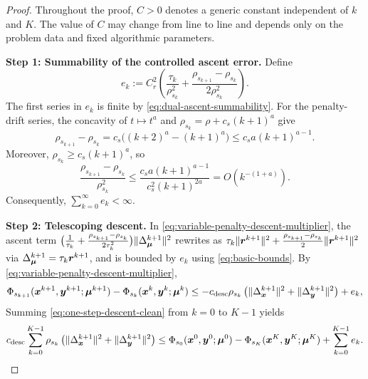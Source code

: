 \begin{proof}
Throughout the proof, $C>0$ denotes a generic constant independent of $k$
and $K$.  The value of $C$ may change from line to line and depends only on
the problem data and fixed algorithmic parameters.

\textbf{Step 1: Summability of the controlled ascent error.}
Define
\[
    e_k
    :=
    C_r^2\left(
    \frac{\tau_k}{\rho_{s_k}^2}
    +
    \frac{\rho_{s_{k+1}}-\rho_{s_k}}{2\rho_{s_k}^2}
    \right).
\]
The first series in $e_k$ is finite by
\eqref{eq:dual-ascent-summability}.  For the penalty-drift series, the
concavity of $t\mapsto t^a$ and
$\rho_{s_k}=\rho+c_s(k+1)^a$ give
\[
    \rho_{s_{k+1}}-\rho_{s_k}
    =
    c_s\bigl((k+2)^a-(k+1)^a\bigr)
    \le
    c_sa(k+1)^{a-1}.
\]
Moreover, $\rho_{s_k}\ge c_s(k+1)^a$, so
\[
    \frac{\rho_{s_{k+1}}-\rho_{s_k}}{\rho_{s_k}^2}
    \le
    \frac{c_sa(k+1)^{a-1}}{c_s^2(k+1)^{2a}}
    =
    O(k^{-(1+a)}).
\]
Consequently, $\sum_{k=0}^{\infty}e_k<\infty$.

\textbf{Step 2: Telescoping descent.}
In \eqref{eq:variable-penalty-descent-multiplier}, the ascent term
$\bigl(\frac{1}{\tau_k}+\frac{\rho_{s_{k+1}}-\rho_{s_k}}{2\tau_k^2}\bigr)
\|\Delta_{\bm{\mu}}^{k+1}\|^2$ rewrites as
$\tau_k\|\bm{r}^{k+1}\|^2+\frac{\rho_{s_{k+1}}-\rho_{s_k}}{2}\|\bm{r}^{k+1}\|^2$
via $\Delta_{\bm{\mu}}^{k+1}=\tau_k\bm{r}^{k+1}$, and is bounded by $e_k$ using
\eqref{eq:basic-bounds}.
By \eqref{eq:variable-penalty-descent-multiplier}, 
\begin{equation}\label{eq:one-step-descent-clean}
    \Phi_{s_{k+1}}(\bm{x}^{k+1},\bm{y}^{k+1};\bm{\mu}^{k+1})
    -
    \Phi_{s_k}(\bm{x}^k,\bm{y}^k;\bm{\mu}^k)
    \le
    -c_{\mathrm{desc}}\rho_{s_k}
    \left(\|\Delta_{\bm{x}}^{k+1}\|^2+\|\Delta_{\bm{y}}^{k+1}\|^2\right)
    +e_k,
\end{equation}
Summing \eqref{eq:one-step-descent-clean} from $k=0$ to $K-1$ yields
\[
    c_{\mathrm{desc}}
    \sum_{k=0}^{K-1}
    \rho_{s_k}\left(\|\Delta_{\bm{x}}^{k+1}\|^2+\|\Delta_{\bm{y}}^{k+1}\|^2\right)
    \le
    \Phi_{s_0}(\bm{x}^0,\bm{y}^0;\bm{\mu}^0)
    -
    \Phi_{s_K}(\bm{x}^K,\bm{y}^K;\bm{\mu}^K)
    +
    \sum_{k=0}^{K-1}e_k.
\]


\end{proof}
